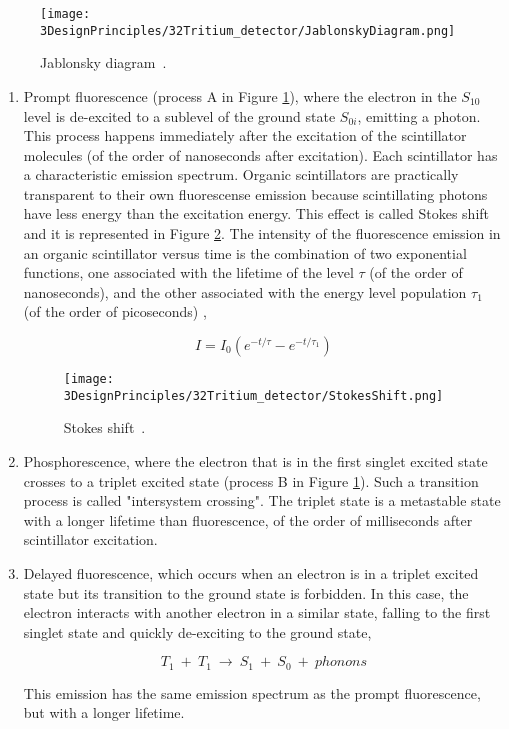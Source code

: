 \begin{figure}[htbp]
\centering
\texttt{[image: 3DesignPrinciples/32Tritium\_detector/JablonskyDiagram.png]}
\caption{Jablonsky diagram\label{fig:JablonskyDiagram}~\cite{Knoll}.}
\end{figure}

\begin{enumerate}

\item{} Prompt fluorescence (process A in Figure \ref{fig:JablonskyDiagram}), where the electron in the $S_{10}$ level  is de-excited to a sublevel of the ground state $S_{0i}$, emitting a photon. This process happens immediately after the excitation of the scintillator molecules (of the order of nanoseconds after excitation). Each scintillator has a characteristic emission spectrum. Organic scintillators are practically transparent to their own fluorescense emission because scintillating photons have less energy than the excitation energy. This effect is called Stokes shift and it is represented in Figure \ref{fig:StokesShift}. The intensity of the fluorescence emission in an organic scintillator versus time is the combination of two exponential functions, one associated with the lifetime of the level $\tau$ (of the order of nanoseconds), and the other associated with the energy level population $\tau_1$ (of the order of picoseconds) \cite{Knoll},

\begin{equation}
I=I_0\left(e^{-t/\tau} - e^{-t/\tau_1}\right) 
\label{eq:IntensityTimeScintillator}
\end{equation}

\begin{figure}[htbp]
\centering
\texttt{[image: 3DesignPrinciples/32Tritium\_detector/StokesShift.png]}
\caption{Stokes shift\label{fig:StokesShift}~\cite{Knoll}.}
\end{figure}

\item{} Phosphorescence, where the electron that is in the first singlet excited state crosses to a triplet excited state (process B in Figure \ref{fig:JablonskyDiagram}). Such a transition process is called "intersystem crossing". The triplet state is a metastable state with a longer lifetime than fluorescence, of the order of milliseconds after scintillator excitation.

\item{} Delayed fluorescence, which occurs when an electron is in a triplet excited state but its transition to the ground state is forbidden. In this case, the electron interacts with another electron in a similar state, falling to the first singlet state and quickly de-exciting to the ground state, 

\begin{equation}
T_{1} ~+~ T_{1}~ \longrightarrow ~ S_{1} ~+~ S_{0} ~+~ phonons
\label{eq:DelayFluorescence}
\end{equation}

This emission has the same emission spectrum as the prompt fluorescence, but with a longer lifetime.
\end{enumerate}

